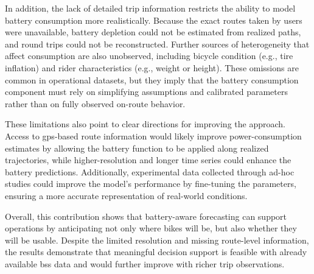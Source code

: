 In addition, the lack of detailed trip information restricts the ability to model battery consumption more realistically. Because the exact routes taken by users were unavailable, battery depletion could not be estimated from realized paths, and round trips could not be reconstructed. Further sources of heterogeneity that affect consumption are also unobserved, including bicycle condition (e.g., tire inflation) and rider characteristics (e.g., weight or height). These omissions are common in operational datasets, but they imply that the battery consumption component must rely on simplifying assumptions and calibrated parameters rather than on fully observed on-route behavior.

These limitations also point to clear directions for improving the approach. Access to \ac{gps}-based route information would likely improve power-consumption estimates by allowing the battery function to be applied along realized trajectories, while higher-resolution and longer time series could enhance the battery predictions. Additionally, experimental data collected through ad-hoc studies could improve the model's performance by fine-tuning the parameters, ensuring a more accurate representation of real-world conditions.

Overall, this contribution shows that battery-aware forecasting can support operations by anticipating not only where bikes will be, but also whether they will be usable. Despite the limited resolution and missing route-level information, the results demonstrate that meaningful decision support is feasible with already available \ac{bss} data and would further improve with richer trip observations.
